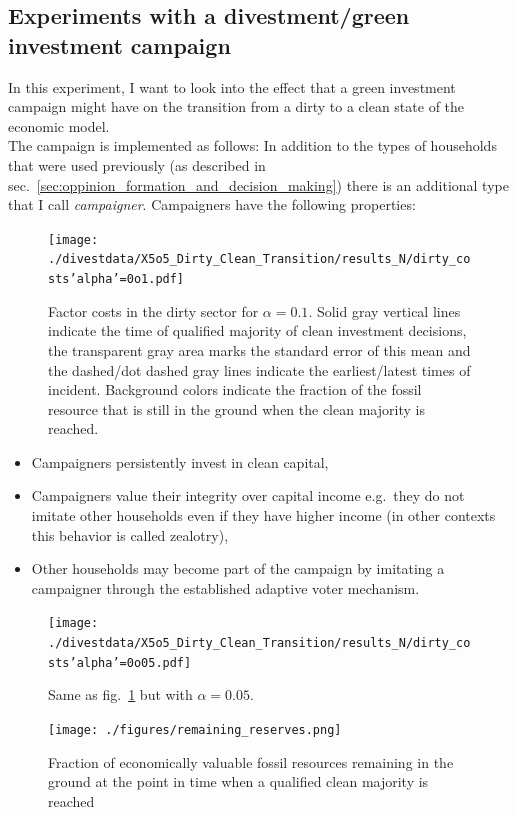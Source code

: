 \subsection{Experiments with a divestment/green investment campaign}
In this experiment, I want to look into the effect that a green investment campaign might have on the transition from a dirty to a clean state of the economic model.\\
The campaign is implemented as follows: In addition to the types of households that were used previously (as described in sec.~\ref{sec:oppinion_formation_and_decision_making}) there is an additional type that I call \textit{campaigner}. Campaigners have the following properties:
\begin{figure}[H]
	\centering
	\texttt{[image: ./divestdata/X5o5\_Dirty\_Clean\_Transition/results\_N/dirty\_costs'alpha'=0o1.pdf]}
	\caption{Factor costs in the dirty sector for $\alpha = 0.1$. Solid gray vertical lines indicate the time of qualified majority of clean investment decisions, the transparent gray area marks the standard error of this mean and the dashed/dot dashed gray lines indicate the earliest/latest times of incident. Background colors indicate the fraction of the fossil resource that is still in the ground when the clean majority is reached.}
	\label{fig:campaign_dirty_cost0o1}
\end{figure}
\begin{itemize}
	\item Campaigners persistently invest in clean capital,
	\item Campaigners value their integrity over capital income e.g.\ they do not imitate other households even if they have higher income (in other contexts this behavior is called zealotry),
	\item Other households may become part of the campaign by imitating a campaigner through the established adaptive voter mechanism.
\end{itemize}
\begin{figure}[H]
	\centering
	\texttt{[image: ./divestdata/X5o5\_Dirty\_Clean\_Transition/results\_N/dirty\_costs'alpha'=0o05.pdf]}
	\caption{Same as fig.~\ref{fig:campaign_dirty_cost0o1} but with $\alpha = 0.05$.}
	\label{fig:campaign_dirty_cost0o05}
\end{figure}


\begin{figure}
	\vspace{-.4 cm}
	\texttt{[image: ./figures/remaining\_reserves.png]}
	\caption{Fraction of economically valuable fossil resources remaining in the ground at the point in time when a qualified clean majority is reached \label{fig:remaining_reserves}}
\end{figure}

